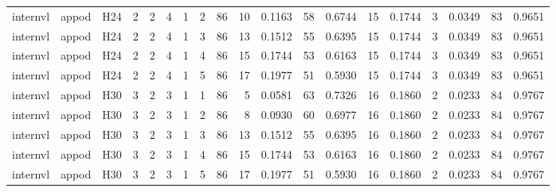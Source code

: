 \begin{longtable}{lllrrrrrrrrrrrrrrrr}
internvl & appod & H24 & 2 & 2 & 4 & 1 & 2 & 86 & 10 & 0.1163 & 58 & 0.6744 & 15 & 0.1744 & 3 & 0.0349 & 83 & 0.9651 \\
internvl & appod & H24 & 2 & 2 & 4 & 1 & 3 & 86 & 13 & 0.1512 & 55 & 0.6395 & 15 & 0.1744 & 3 & 0.0349 & 83 & 0.9651 \\
internvl & appod & H24 & 2 & 2 & 4 & 1 & 4 & 86 & 15 & 0.1744 & 53 & 0.6163 & 15 & 0.1744 & 3 & 0.0349 & 83 & 0.9651 \\
internvl & appod & H24 & 2 & 2 & 4 & 1 & 5 & 86 & 17 & 0.1977 & 51 & 0.5930 & 15 & 0.1744 & 3 & 0.0349 & 83 & 0.9651 \\
internvl & appod & H30 & 3 & 2 & 3 & 1 & 1 & 86 & 5 & 0.0581 & 63 & 0.7326 & 16 & 0.1860 & 2 & 0.0233 & 84 & 0.9767 \\
internvl & appod & H30 & 3 & 2 & 3 & 1 & 2 & 86 & 8 & 0.0930 & 60 & 0.6977 & 16 & 0.1860 & 2 & 0.0233 & 84 & 0.9767 \\
internvl & appod & H30 & 3 & 2 & 3 & 1 & 3 & 86 & 13 & 0.1512 & 55 & 0.6395 & 16 & 0.1860 & 2 & 0.0233 & 84 & 0.9767 \\
internvl & appod & H30 & 3 & 2 & 3 & 1 & 4 & 86 & 15 & 0.1744 & 53 & 0.6163 & 16 & 0.1860 & 2 & 0.0233 & 84 & 0.9767 \\
internvl & appod & H30 & 3 & 2 & 3 & 1 & 5 & 86 & 17 & 0.1977 & 51 & 0.5930 & 16 & 0.1860 & 2 & 0.0233 & 84 & 0.9767 \\
\end{longtable}
